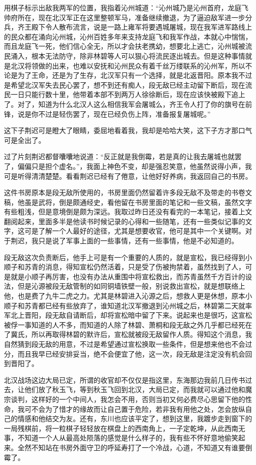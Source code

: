 用棋子标示出敌我两军的位置，我指着沁州城道：“沁州城乃是沁州首府，龙庭飞帅府所在，现在北汉军正在这里整顿军马，准备继续撤退，为了逼迫敌军进一步分兵，齐王殿下令人散布流言，说是一路上雍军将要遇城屠城，现在我军进军路线上的民众都在涌向沁州城，沁州百姓多年来支持龙庭飞和我军作战，本就心中惴惴，而且龙庭飞一死，他们信心全无，所以才会扶老携幼，想要北上逃亡，沁州城被流民涌入，根本无法防守，除非林碧等人可以狠心将流民逐出城去。但是这种事情就是北汉将领做的出来，也难以安抚和沁州民众有着千丝万缕联系的沁州军，所以不论是为了王命，还是为了生存，北汉军只有一个选择，就是北返晋阳。原本我不过是希望北汉军失去民心罢了，想不到还有痴人，段无敌已经主动留下断后，现在流民一日只能行数十里，他带着本部不到两万人徐徐断后，现在应该快被殿下追上了。对了，知道为什么北汉人这么相信我军会屠城么，齐王令人打了你的旗号在前锋，说是你不过是轻伤罢了，现在已经负伤上阵，准备报复屠城呢。”

这下子荆迟可是瞪大了眼睛，委屈地看着我，我却是哈哈大笑，这下子方才那口气可是全出了。

过了片刻荆迟都督囔囔地说道：“反正就是我倒霉，若是真的让我去屠城也就罢了，偏偏只是担个虚名。”，我面上神色不变，却是强忍笑意，他虽然说得小声，我可是听得清清楚楚。看看荆迟已经有了倦意，让他好好养病，我返回自己的书房。

这件书房原本是段无敌所使用的，书房里面仍然留着许多段无敌不及带走的书卷文稿，他虽是武将，倒是颇通经史，看他留在书房里面的笔记和一些文稿，虽然文字有些粗浅，但是意境倒是颇为深远。我取过昨日还没有看完的一本笔记，接着上文翻阅起来，里面多半是他读书时候记录的心得和一些随笔，还有一些类似记事的文字，这可是了解一个人最好的途径，尤其是想要收官，他可是其中一个关键啊。对于荆迟，我只是说了军事上面的一些事情，还有一些事情，他是不必知道的。

段无敌这次负责断后，他手上可是有一个重要的人质的，就是宣松，我已经得到小顺子和苏青的消息，得知宣松仍然活着，只是受了伤被拘禁着，虽然找到了人，可是就是小顺子再厉害，也没有办法从重围中将宣松救出，而苏青虽然千方百计的设法，但是沁源被段无敌管制的如同铜墙铁壁一般，别说救出宣松，就是想联络上他，也是费了九牛二虎之力。尤其是林碧进入沁源之后，想救人更是休想，原本小顺子和苏青都已经有些放弃了，谁知道北汉军撤退到沁州城之后，林碧第二天就率军北上晋阳，段无敌自请断后，却将宣松暗中留了下来。说起来也是很巧，这宣松被俘一事知道的人不多，而知道的人除了林碧、萧桐和段无敌之外几乎都已经死在了冀氏，所以再取得林碧的默许后，宣松就被段无敌留作人质。得知这个消息，我自然猜到段无敌的用意，不过是希望通过宣松换取一些条件，但是想来他也不会过分，而且我早已经安排妥当，绝不会便宜了他，这一次，段无敌是注定没有机会回到晋阳了。

北汉战场这边大局已定，所谓的收官却不仅仅是指这里，东海那边我前几日传书过去，让他们放了秋玉飞，等到秋玉飞回到北汉，大局已定，而我就可以通过他和魔宗谈判，这样好的一个中间人，我怎会不用，否则当初又何必费尽心思留下他的性命，我可不会为了惜才的缘故而让自己置于危险，若非我有用他之处，怎会放纵自己的情感和他结交为友。还有，东川也应该平定了，想到这里，我踱步走到窗下的一局残棋前，将一粒棋子轻轻放在棋盘上的西南角上，一子定乾坤，从此西南无事，不知道一个人从最高处陨落的感觉是什么样子的，我有些不怀好意地偷笑起来。全然不知站在书房外面守卫的呼延寿打了一个冷战，心道，不知道又有谁要倒霉了。

